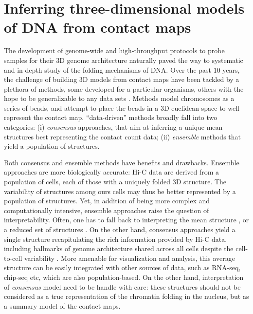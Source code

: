 \documentclass[2columns]{article}
\begin{document}
\section*{Inferring three-dimensional models of DNA from contact maps}

The development of genome-wide and high-throughput protocols to probe samples
for their 3D genome architecture naturally paved the way to systematic and in
depth study of the folding mechanisms of DNA. Over the past 10 years, the
challenge of building 3D models from contact maps have been tackled by a
plethora of methods, some developed for a particular organisms, others with
the hope to be generalizable to any data sets \citep{dekker:capturing,
duan:three-dimensional, tanizawa:mapping, ay:three-dimensional,
peng:sequencing, lesne:3d, ben-elazar:spatial, zhang:inference, trieu:large,
trieu:MOGEN, trieu:3D, bau:three-dimensional, umbarger:three-dimensional,
rousseau:three, hu:bayesian}. Methods model chromosomes as a
series of beads, and attempt to place the beads in a 3D euclidean space to
well represent the contact map. ``data-driven'' methods broadly fall into two
categories: (i) \textit{consensus} approaches, that aim at inferring a unique
mean structures best representing the contact count data; (ii)
\textit{ensemble} methods that yield a population of structures.

Both consensus and ensemble methods have benefits and drawbacks. Ensemble
approaches are more biologically accurate: Hi-C data are derived from a
population of cells, each of those with a uniquely folded 3D structure. The
variability of structures among ours cells may thus be better represented by a
population of structures. Yet, in addition of being more complex and
computationally intensive, ensemble approaches raise the question of
interpretability. Often, one has to fall back to interpreting the mean
structure \citep{kalhor:genome}, or a reduced set of structures
\citep{rousseau:three}. On the other hand, consensus approaches yield a single
structure recapitulating the rich information provided by Hi-C data, including
hallmarks of genome architecture shared across all cells despite the
cell-to-cell variability \citep{nagano:single-cell}. More amenable for
visualization and analysis, this average structure can be easily integrated
with other sources of data, such as RNA-seq, chip-seq etc, which are also
population-based. On the other hand, interpretation of \textit{consensus}
model need to be handle with care: these structures should not be considered
as a true representation of the chromatin folding in the nucleus, but as a
summary model of the contact maps.
\end{document}
